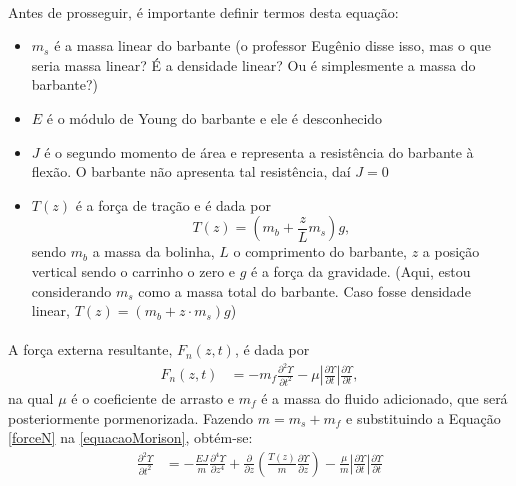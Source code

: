 \documentclass[a4paper,11pt]{scrartcl} %
\numberwithin{equation}{section} %
\numberwithin{figure}{section} %
\numberwithin{table}{section} %
\begin{document}
\paragraph{} Antes de prosseguir, é importante definir termos desta equação: \begin{itemize}
	\item $m_s$ é a massa linear do barbante (o professor Eugênio disse isso, mas o que seria massa linear? É a densidade linear? Ou é simplesmente a massa do barbante?) 
	\item $E$ é o módulo de Young do barbante e ele é desconhecido
	\item $J$ é o segundo momento de área e representa a resistência do barbante à flexão. O barbante não apresenta tal resistência, daí $J=0$
	\item $T(z)$ é a força de tração e é dada por \[T(z) = \left(m_b+\frac{z}{L}m_s\right)g,\] sendo $m_b$ a massa da bolinha, $L$ o comprimento do barbante, $z$ a posição vertical sendo o carrinho o zero e $g$ é a força da gravidade. (Aqui, estou considerando $m_s$ como a massa total do barbante. Caso fosse densidade linear, $T(z) = (m_b + z\cdot m_s) g$)
\end{itemize}

\paragraph{} A força externa resultante, $F_n(z,t)$, é dada por \begin{align}
	F_n(z,t) &= -m_f \frac{\partial^2 \Upsilon}{\partial t^2} - \mu \left|\frac{\partial \Upsilon}{\partial t}\right|\frac{\partial \Upsilon}{\partial t}\label{forceN},
\end{align} na qual $\mu$ é o coeficiente de arrasto e $m_f$ é a massa do fluido adicionado, que será posteriormente pormenorizada. Fazendo $m = m_s + m_f$ e substituindo a Equação \ref{forceN} na \ref{equacaoMorison}, obtém-se: \begin{align}
	\frac{\partial^2 \Upsilon}{\partial t^2} &= -\frac{EJ}{m}\frac{\partial^4 \Upsilon}{\partial z^4} + \frac{\partial}{\partial z}\left(\frac{T(z)}{m}\frac{\partial \Upsilon}{\partial z}\right) - \frac{\mu}{m}\left|\frac{\partial \Upsilon}{\partial t}\right|\frac{\partial \Upsilon}{\partial t}
\end{align}
\end{document}
